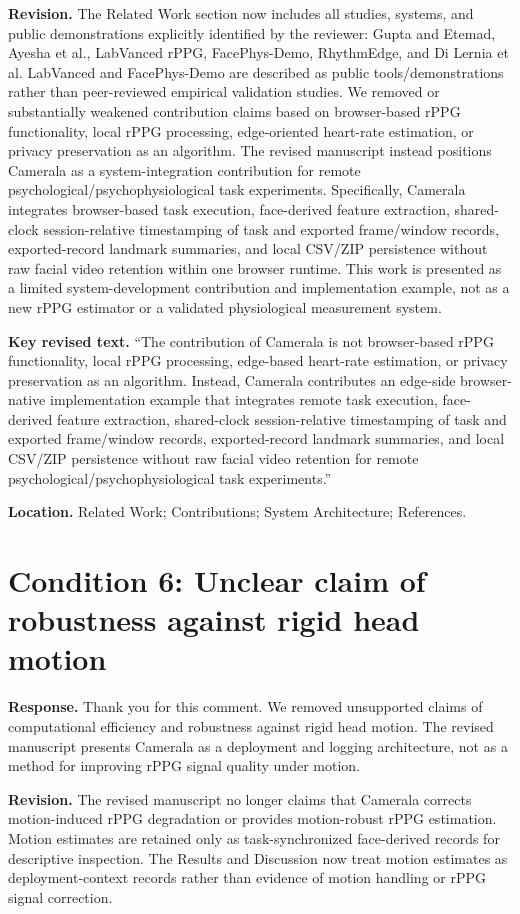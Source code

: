 \documentclass[11pt]{article}
\newcommand{\condition}[2]{\section*{Condition #1: #2}}
\begin{document}
\textbf{Revision.}
The Related Work section now includes all studies, systems, and public demonstrations explicitly identified by the reviewer: Gupta and Etemad, Ayesha et al., LabVanced rPPG, FacePhys-Demo, RhythmEdge, and Di Lernia et al.
LabVanced and FacePhys-Demo are described as public tools/demonstrations rather than peer-reviewed empirical validation studies.
We removed or substantially weakened contribution claims based on browser-based rPPG functionality, local rPPG processing, edge-oriented heart-rate estimation, or privacy preservation as an algorithm.
The revised manuscript instead positions Camerala as a system-integration contribution for remote psychological/psychophysiological task experiments.
Specifically, Camerala integrates browser-based task execution, face-derived feature extraction, shared-clock session-relative timestamping of task and exported frame/window records, exported-record landmark summaries, and local CSV/ZIP persistence without raw facial video retention within one browser runtime.
This work is presented as a limited system-development contribution and implementation example, not as a new rPPG estimator or a validated physiological measurement system.

\textbf{Key revised text.}
``The contribution of Camerala is not browser-based rPPG functionality, local rPPG processing, edge-based heart-rate estimation, or privacy preservation as an algorithm. Instead, Camerala contributes an edge-side browser-native implementation example that integrates remote task execution, face-derived feature extraction, shared-clock session-relative timestamping of task and exported frame/window records, exported-record landmark summaries, and local CSV/ZIP persistence without raw facial video retention for remote psychological/psychophysiological task experiments.''

\textbf{Location.}
Related Work; Contributions; System Architecture; References.

\condition{6}{Unclear claim of robustness against rigid head motion}
\textbf{Response.}
Thank you for this comment.
We removed unsupported claims of computational efficiency and robustness against rigid head motion.
The revised manuscript presents Camerala as a deployment and logging architecture, not as a method for improving rPPG signal quality under motion.

\textbf{Revision.}
The revised manuscript no longer claims that Camerala corrects motion-induced rPPG degradation or provides motion-robust rPPG estimation.
Motion estimates are retained only as task-synchronized face-derived records for descriptive inspection.
The Results and Discussion now treat motion estimates as deployment-context records rather than evidence of motion handling or rPPG signal correction.
\end{document}
